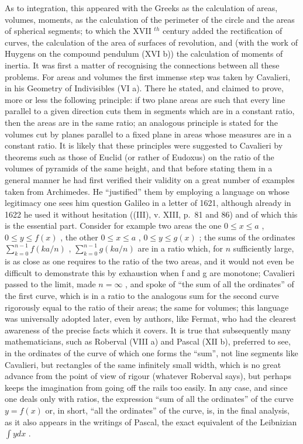 As to integration, this appeared with the Greeks as the calculation of areas, volumes, moments, as the calculation of the perimeter of the circle and the areas of spherical segments; to which the XVII \(^{th}\) century added the rectification of curves, the calculation of the area of surfaces of revolution, and (with the work of Huygens on the compound pendulum (XVI b)) the calculation of moments of inertia. It was first a matter of recognising the connections between all these problems. For areas and volumes the first immense step was taken by Cavalieri, in his Geometry of Indivisibles (VI a). There he stated, and claimed to prove, more or less the following principle: if two plane areas are such that every line parallel to a given direction cuts them in segments which are in a constant ratio, then the areas are in the same ratio; an analogous principle is stated for the volumes cut by planes parallel to a fixed plane in areas whose measures are in a constant ratio. It is likely that these principles were suggested to Cavalieri by theorems such as those of Euclid (or rather of Eudoxus) on the ratio of the volumes of pyramids of the same height, and that before stating them in a general manner he had first verified their validity on a great number of examples taken from Archimedes. He ``justified'' them by employing a language on whose legitimacy one sees him question Galileo in a letter of 1621, although already in 1622 he used it without hesitation ((III), v. XIII, p.~81 and 86) and of which this is the essential part. Consider for example two areas the one \(0 \leqslant x \leqslant a\) , \(0 \leqslant y \leqslant f(x)\) , the other \(0 \leqslant x \leqslant a\) , \(0 \leqslant y \leqslant g(x)\) ; the sums of the ordinates \(\sum_{k=0}^{n-1} f(ka/n)\) , \(\sum_{k=0}^{n-1} g(ka/n)\) are in a ratio which, for \(n\) sufficiently large, is as close as one requires to the ratio of the two areas, and it would not even be difficult to demonstrate this by exhaustion when f and g are monotone; Cavalieri passed to the limit, made \(n = \infty\) , and spoke of ``the sum of all the ordinates'' of the first curve, which is in a ratio to the analogous sum for the second curve rigorously equal to the ratio of their areas; the same for volumes; this language was universally adopted later, even by authors, like Fermat, who had the clearest awareness of the precise facts which it covers. It is true that subsequently many mathematicians, such as Roberval (VIII a) and Pascal (XII b), preferred to see, in the ordinates of the curve of which one forms the ``sum'', not line segments like Cavalieri, but rectangles of the same infinitely small width, which is no great advance from the point of view of rigour (whatever Roberval says), but perhaps keeps the imagination from going off the rails too easily. In any case, and since one deals only with ratios, the expression ``sum of all the ordinates'' of the curve \(y = f(x)\) or, in short, ``all the ordinates'' of the curve, is, in the final analysis, as it also appears in the writings of Pascal, the exact equivalent of the Leibnizian \(\int y dx\) .

